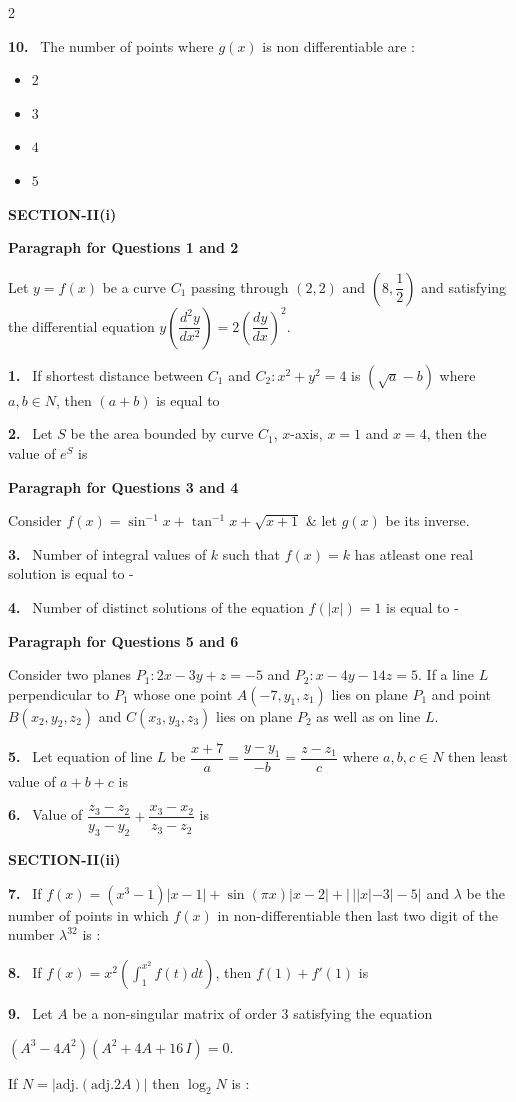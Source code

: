 \documentclass[10pt]{extarticle}
\newcommand{\sect}[1]{\par\smallskip\noindent\textbf{#1}\par}
\newcommand{\qn}[1]{\par\smallskip\noindent\textbf{#1.}~}
\newcommand{\paraq}[2]{\par\smallskip\noindent\textbf{Paragraph for Questions #1 and #2}\par}
\newenvironment{qoptions}{\begin{itemize}[leftmargin=1.8em,itemsep=1pt,topsep=2pt,label={}]}{\end{itemize}}
\newcommand{\opt}[2]{\item[(#1)] #2}
\begin{document}
\begin{multicols}{2}
\qn{10} The number of points where $g(x)$ is non differentiable are :
\begin{qoptions}
\opt{A}{$2$}
\opt{B}{$3$}
\opt{C}{$4$}
\opt{D}{$5$}
\end{qoptions}
\sect{SECTION-II(i)}
\paraq{1}{2}
Let $y=f(x)$ be a curve $C_1$ passing through $(2,2)$ and $\left(8,\dfrac12\right)$ and satisfying the differential equation $y\left(\dfrac{d^2y}{dx^2}\right)=2\left(\dfrac{dy}{dx}\right)^2$.
\qn{1} If shortest distance between $C_1$ and $C_2:x^2+y^2=4$ is $(\sqrt a-b)$ where $a,b\in N$, then $(a+b)$ is equal to
\qn{2} Let $S$ be the area bounded by curve $C_1$, $x$-axis, $x=1$ and $x=4$, then the value of $e^S$ is
\paraq{3}{4}
Consider $f(x)=\sin^{-1}x+\tan^{-1}x+\sqrt{x+1}$ \& let $g(x)$ be its inverse.
\qn{3} Number of integral values of $k$ such that $f(x)=k$ has atleast one real solution is equal to -
\qn{4} Number of distinct solutions of the equation $f(|x|)=1$ is equal to -
\paraq{5}{6}
Consider two planes $P_1:2x-3y+z=-5$ and $P_2:x-4y-14z=5$. If a line $L$ perpendicular to $P_1$ whose one point $A(-7,y_1,z_1)$ lies on plane $P_1$ and point $B(x_2,y_2,z_2)$ and $C(x_3,y_3,z_3)$ lies on plane $P_2$ as well as on line $L$.
\qn{5} Let equation of line $L$ be $\dfrac{x+7}{a}=\dfrac{y-y_1}{-b}=\dfrac{z-z_1}{c}$ where $a,b,c\in N$ then least value of $a+b+c$ is
\qn{6} Value of $\dfrac{z_3-z_2}{y_3-y_2}+\dfrac{x_3-x_2}{z_3-z_2}$ is
\sect{SECTION-II(ii)}
\qn{7} If $f(x)=(x^3-1)|x-1|+\sin(\pi x)|x-2|+\left|\,||x|-3|-5\right|$ and $\lambda$ be the number of points in which $f(x)$ in non-differentiable then last two digit of the number $\lambda^{32}$ is :
\qn{8} If $f(x)=x^2\left(\displaystyle\int_1^{x^2}f(t)dt\right)$, then $f(1)+f'(1)$ is
\qn{9} Let $A$ be a non-singular matrix of order $3$ satisfying the equation\par
$(A^3-4A^2)(A^2+4A+16\,I)=0$.\par
If $N=|\mathrm{adj}.(\mathrm{adj}.2A)|$ then $\log_2N$ is :
\end{multicols}
\end{document}
